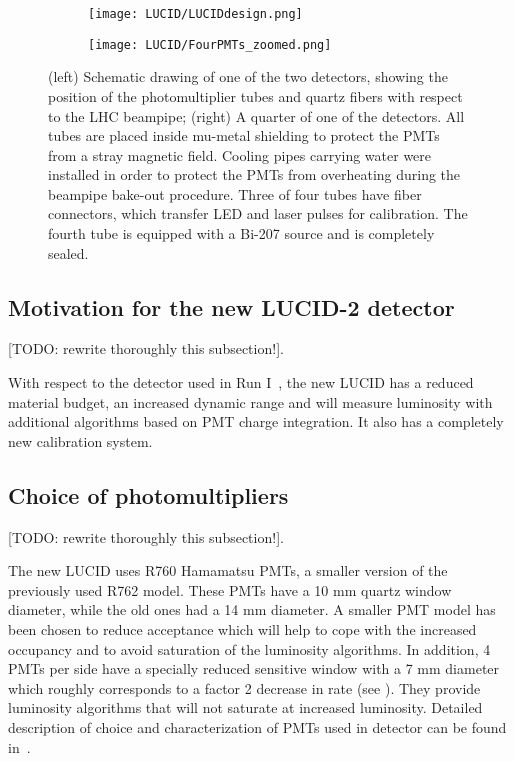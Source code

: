 \begin{figure}
\centering
\begin{subfigure}{.5\textwidth}
  \centering
  \texttt{[image: LUCID/LUCIDdesign.png]}
\end{subfigure}%
\begin{subfigure}{.5\textwidth}
  \centering
  \texttt{[image: LUCID/FourPMTs\_zoomed.png]}
\end{subfigure}
\caption{(left) Schematic drawing of one of the two detectors, showing the position of the photomultiplier tubes 
and quartz fibers with respect to the LHC beampipe; (right) A quarter of one of the detectors. All tubes are 
placed inside mu-metal shielding to protect the PMTs from a stray magnetic field. Cooling pipes carrying water were installed in order 
to protect the PMTs from overheating during the beampipe bake-out procedure. Three of four tubes have fiber connectors, which
transfer LED and laser pulses for calibration. The fourth tube is equipped with a Bi-207 source and is completely 
sealed.}
\label{fig:LucidDrawing}
\end{figure}


\subsection{Motivation for the new LUCID-2 detector}
\label{subsec:motivationNewLucid}

[TODO: rewrite thoroughly this subsection!].

With respect to the detector used in Run I~\cite{Aad:2013ucp}, the new LUCID has a reduced material budget, 
an increased dynamic 
range and will measure luminosity with additional algorithms based on PMT charge integration. It also has a 
completely new calibration system.

\subsection{Choice of photomultipliers}
\label{subsec:PMTChoice}

[TODO: rewrite thoroughly this subsection!].

The new LUCID uses R760 Hamamatsu PMTs, a smaller version of the previously used R762 model. These PMTs have a 
10 mm quartz window diameter, while the old ones had a 14 mm diameter. A smaller PMT model has been chosen to reduce acceptance 
which will help to cope with the increased occupancy and to avoid saturation of the luminosity algorithms.
In addition, 4 PMTs per side have a specially reduced sensitive window with a 7 mm diameter which roughly 
corresponds to a factor 2 decrease in rate (see ). They provide luminosity algorithms that will not saturate at 
increased luminosity. Detailed description of choice and characterization of PMTs used in detector can be found in~\cite{Alberghi:2016tad}.

